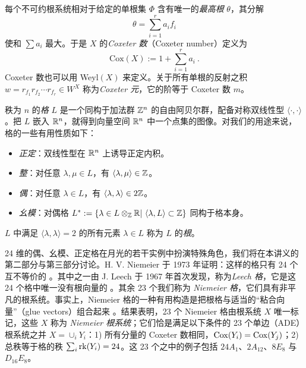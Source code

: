 每个不可约根系统相对于给定的单根集 $\Phi$ 含有唯一的\emph{最高根} $\theta$，其分解
\begin{equation}
\theta=\sum_{i=1}^r a_i f_i
\end{equation}
使和 $\sum a_i$ 最大。于是 $X$ 的\emph{Coxeter 数}（Coxeter number）定义为
\begin{equation}
\text{Cox}(X):=1+\sum_{i=1}^ra_i~.
\end{equation}
Coxeter 数也可以用 Weyl$(X)$ 来定义。关于所有单根的反射之积 $w=r_{f_1}r_{f_2}\cdots r_{f_r}\in W^X$ 称为\emph{Coxeter 元}，它的阶等于 Coxeter 数 $m$。


秩为 $n$ 的\emph{格} $L$ 是一个同构于加法群 $\mathbb{Z}^n$ 的自由阿贝尔群，配备对称双线性型 $\langle\cdot,\cdot\rangle$。把 $L$ 嵌入 $\mathbb{R}^n$，就得到向量空间 $\mathbb{R}^n$ 中一个点集的图像。对我们的用途来说，格的一些有用性质如下：
\begin{itemize}
\item \emph{正定}：双线性型在 $\mathbb{R}^n$ 上诱导正定内积。
\item \emph{整}：对任意 $\lambda,\mu\in L$，有 $\langle\lambda,\mu\rangle\in\mathbb{Z}$。
\item \emph{偶}：对任意 $\lambda\in L$，有 $\langle\lambda,\lambda\rangle\in2\mathbb{Z}$。
\item \emph{幺模}：对偶格 $L^*:=\lbrace \lambda\in L \otimes_{\mathbb{Z}} \mathbb{R} |~\langle\lambda,L\rangle\subset\mathbb{Z}\rbrace$ 同构于格本身。
\end{itemize}
$L$ 中满足 $\langle\lambda,\lambda\rangle=2$ 的所有元素 $\lambda\in L$ 称为 $L$ 的\emph{根}。

24 维的偶、幺模、正定格在月光的若干实例中扮演特殊角色，我们将在本讲义的第二部分与第三部分讨论。H. V. Niemeier 于 1973 年证明：这样的格只有 24 个互不等价的 \cite{Nie_DefQdtFrm24}。其中之一由 J. Leech 于 1967 年首次发现，称为\emph{Leech 格}，它是这 24 个格中唯一没有根向量的 \cite{Lee_SphPkgs,Con_ChrLeeLat,Lee_SphPkgHgrSpc}。其余 23 个我们称为 \emph{Niemeier 格}，它们具有非平凡的根系统。事实上，Niemeier 格的一种有用构造是把根格与适当的“粘合向量”（glue vectors）组合起来 \cite{sphere_packing}。结果表明，23 个 Niemeier 格由根系统 $X$ 唯一标记，这些 $X$ 称为 \emph{Niemeier 根系统}；它们恰是满足以下条件的 23 个单边（ADE）根系统之并 $X= \cup_i  Y_i$：1) 所有分量的 Coxeter 数相同，${\rm Cox}(Y_i)={\rm Cox}(Y_j)$；2) 总秩等于格的秩 $\sum_i {\rm rk} (Y_i)=24$。这 23 个之中的例子包括 $24A_1$、$2A_{12}$、$8E_8$ 与 $D_{16}E_8$。

